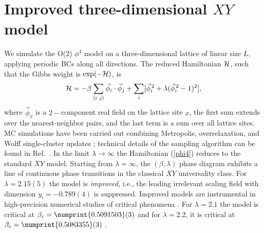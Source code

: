\documentclass[pre,twocolumn]{revtex4-2}
\def\<{\langle}
\def\>{\rangle}
\begin{document}
\section{Improved three-dimensional $XY$ model}
\label{sec:xy}
We simulate the O(2) $\phi^4$ model on a three-dimensional lattice of linear size $L$, applying periodic BCs along all directions.
The reduced Hamiltonian ${\cal H}$, such that the Gibbs weight is $\exp(-\cal H)$, is
\begin{equation}
  {\cal H} = -\beta\sum_{\< i\ j\>}\vec{\phi}_i\cdot\vec{\phi}_j
  +\sum_i[\vec{\phi}_i^{\,2}+\lambda(\vec{\phi}_i^{\,2}-1)^2],
  \label{phi4}
\end{equation}
where $\vec{\phi}_x$ is a $2-$component real field on the lattice site $x$, the first sum extends over the nearest-neighbor pairs, and the last term is a sum over all lattice sites.
MC simulations have been carried out combining Metropolis, overrelaxation, and Wolff single-cluster updates \cite{Wolff-89}; technical details of the sampling algorithm can be found in Ref.~\cite{PT-20}.
In the limit $\lambda\rightarrow\infty$ the Hamiltonian (\ref{phi4}) reduces to the standard $XY$ model.
Starting from $\lambda=\infty$, the $(\beta,\lambda)$ phase diagram exhibits a line of continuous phase transitions in the classical $XY$ universality class.
For $\lambda=2.15(5)$ \cite{CHPV-06} the model is {\it improved}, i.e., the leading irrelevant scaling field with dimension $y_i=-0.789(4)$ \cite{Hasenbusch-19} is suppressed.
Improved models are instrumental in high-precision numerical studies of critical phenomena \cite{PV-02}.
For $\lambda=2.1$ the model is critical at $\beta_c=\numprint{0.5091503}(3)$ and for $\lambda=2.2$, it is critical at $\beta_c=\numprint{0.5083355}(3)$ \cite{CHPV-06}.
\end{document}
